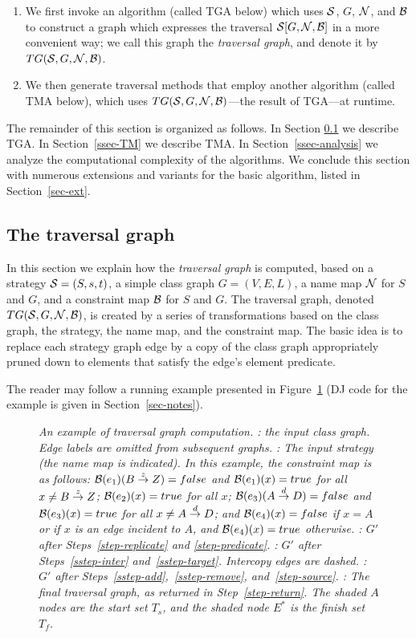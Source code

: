 \begin{enumerate}

\item We first invoke an algorithm (called TGA below) which uses
${\cal S}$, $G$, ${\cal N}$, and ${\cal B}$ to construct a graph which expresses the
traversal ${\cal S}[G,{\cal N},{\cal B}]$ in a more convenient way; we call this
graph the {\em traversal graph}, and denote it by
${\sl TG}({\cal S},G,{\cal N},{\cal B})$.

\item We then generate traversal methods that employ another algorithm
      (called TMA below), which uses ${\sl TG}({\cal S},G,{\cal N},{\cal B})$---the result
      of TGA---at runtime.
\end{enumerate}
The remainder of this section is organized as follows.  In Section
\ref{ssec-TG} we describe TGA.  In Section~\ref{ssec-TM} we
describe TMA.  In Section~\ref{ssec-analysis} we analyze the
computational complexity of the algorithms.  We conclude this section
with numerous extensions and variants for the basic algorithm, listed
in Section~\ref{sec-ext}.

\subsection{The traversal graph}
\label{ssec-TG}
In this section we explain how the {\em traversal graph} is computed,
based on a strategy ${\cal S}=(S,s,t)$, a simple class graph $G=(V,E,L)$, a
name map ${\cal N}$ for $S$ and $G$, and a constraint map ${\cal B}$ for $S$ and
$G$.  The traversal graph, denoted ${\sl TG}({\cal S},G,{\cal N},{\cal B})$, is created by
a series of transformations based on the class graph, the strategy,
the name map, and the constraint map. The basic idea is to replace
each strategy graph edge by a copy of the class graph appropriately
pruned down to elements that satisfy the edge's element predicate.

The reader may follow a running example presented in
Figure~\ref{fig-comp} (DJ code for the example is given in
Section~\ref{sec-notes}).
\begin{figure}
\centerline{}
\caption{\em An example of traversal graph computation.  {}: the
input class graph. Edge labels are omitted from subsequent graphs.
{}: The input strategy (the name map is indicated).  In this
example, the constraint map is as follows: ${\cal B}(e_1)(B\stackrel{z}{\rightarrow}Z)={\sc false}$ and ${\cal B}(e_1)(x)={\sc true}$ for all $x\ne B\stackrel{z}{\rightarrow}Z$;
${\cal B}(e_2)(x)={\sc true}$ for all $x$; ${\cal B}(e_3)(A\stackrel{d}{\rightarrow}D)={\sc false}$ and
${\cal B}(e_3)(x)={\sc true}$ for all $x\ne A\stackrel{d}{\rightarrow}D$; and
${\cal B}(e_4)(x)={\sc false}$ if $x=A$ or if $x$ is an edge incident to $A$,
and ${\cal B}(e_4)(x)={\sc true}$ otherwise.  {}: $G'$ after
Steps~\protect\ref{step-replicate} and \protect\ref{step-predicate}.
{}: $G'$ after Steps~\protect\ref{sstep-inter}
and~\protect\ref{sstep-target}.  Intercopy edges are dashed.  {}:
$G'$ after Steps~\ref{sstep-add},~\ref{sstep-remove},
and~\protect\ref{step-source}.  {}: The final traversal graph, as
returned in Step~\protect\ref{step-return}. The shaded $A$ nodes are
the start set $T_s$, and the shaded node $E^*$ is the finish set
$T_f$.}
\label{fig-comp}
\end{figure}

